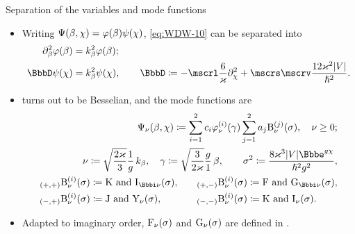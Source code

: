 \documentclass[8pt]{beamer}
\begin{document}
\begin{frame}%
{Separation of the variables and mode functions}%
\begin{itemize}
\item
Writing ${\Psi}\mathopen{}\left(\beta,\chi\right)\mathclose{} = {\varphi}\mathopen{}\left(\beta\right)\mathclose{}
{\psi}\mathopen{}\left(\chi\right)\mathclose{}$, \cref{eq:WDW-10} can be separated into
\begin{align}
\partial_\beta^2\rfun{\varphi}{\beta} &= k_\beta^2\rfun{\varphi}{\beta};\\
\BbbD \rfun{\psi}{\chi} &= k_\beta^2 \rfun{\psi}{\chi},\qquad
\BbbD \coloneqq
-\mscrl \frac{6}{\varkappa} \partial_\chi^2
+ \mscrs\mscrv \frac{12\varkappa^2\vbr{V}}{\hslash^2}.
\label{eq:separated-10}
\end{align}
\item {}
turns out to be Besselian, and the mode functions are
\begin{align}
\rfun{\Psi_\nu}{\beta, \chi} \coloneqq
\sum_{i=1}^2 c_i \rfun{\varphi_{\nu}^{(i)}}{\gamma}
\sum_{j=1}^2 a_j\rfun{\mathrm{B}_{\nu}^{(j)}}{\sigma},\quad
\nu \ge 0; \\
\nu \coloneqq \sqrt{\frac{2\varkappa}{3}}\frac{1}{g}\,k_\beta,\quad
\gamma \coloneqq \sqrt{\frac{3}{2\varkappa}}\frac{g}{1}\,\beta,\qquad
\sigma^2 \coloneqq 
\frac{8\varkappa^3\vbr{V}\ee^{g\chi}}{\hslash^2 g^2},
\label{eq:trsf-quantum-sigma}
\\
\begin{aligned}
\rfun{{}_{\rbr{+,+}}\mathrm{B}^{(i)}_{\nu}}{\sigma} &\coloneqq
\mathrm{K}\text{ and }\rfun{\mathrm{I}_{\ii\nu}}{\sigma},\quad&
\rfun{{}_{\rbr{+,-}}\mathrm{B}^{(i)}_{\nu}}{\sigma} &\coloneqq
\mathrm{F}\text{ and }\rfun{\mathrm{G}_{\ii\nu}}{\sigma},\nonumber \\
\rfun{{}_{\rbr{-,+}}\mathrm{B}^{(i)}_{\nu}}{\sigma} &\coloneqq
\mathrm{J}\text{ and }\rfun{\mathrm{Y}_{\nu}}{\sigma},\quad&
\rfun{{}_{\rbr{-,-}}\mathrm{B}^{(i)}_{\nu}}{\sigma} &\coloneqq
\mathrm{K}\text{ and }\rfun{\mathrm{I}_{\nu}}{\sigma}.
\end{aligned}
\end{align}
\item Adapted to imaginary order, ${\mathrm{F}_{\nu}}\mathopen{}\left(\sigma\right)\mathclose{}$ and
${\mathrm{G}_{\nu}}\mathopen{}\left(\sigma\right)\mathclose{}$ are defined in .
\end{itemize}
\end{frame}
\end{document}
